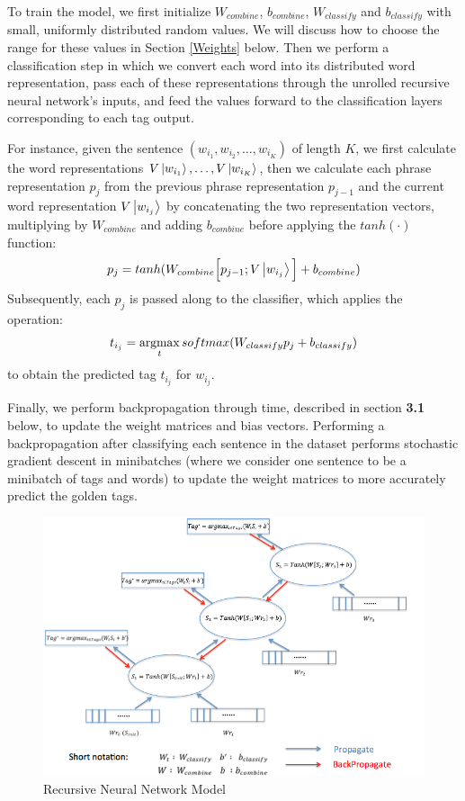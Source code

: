 \documentclass[11pt]{article}
\newcommand{\argmax}{\operatornamewithlimits{argmax}}
\begin{document}
To train the model, we first initialize $W_{combine}$, $b_{combine}$, $W_{classify}$ and $b_{classify}$ with small, uniformly distributed random values. We will discuss how to choose the range for these values in Section \ref{Weights} below. Then we perform a classification step in which we convert each word into its distributed word representation, pass each of these representations through the unrolled recursive neural network's inputs, and feed the values forward to the classification layers corresponding to each tag output.

For instance, given the sentence $(w_{i_1},w_{i_2},\ldots,w_{i_K})$ of length $K$, we first calculate the word representations $V\Ket{w_{i_1}},\ldots,V\Ket{w_{i_K}}$, then we calculate each phrase representation $p_j$ from the previous phrase representation $p_{j-1}$ and the current word representation $V\Ket{w_{i_j}}$ by concatenating the two representation vectors, multiplying by $W_{combine}$ and adding $b_{combine}$ before applying the $tanh(\cdot)$ function:
$$p_j = tanh(W_{combine}\Big[p_{j-1};V\Ket{w_{i_j}}\Big] + b_{combine})$$
Subsequently, each $p_j$ is passed along to the classifier, which applies the operation:
$$t_{i_j} = \argmax\limits_{t} softmax(W_{classify}p_j + b_{classify})$$
to obtain the predicted tag $t_{i_j}$ for $w_{i_j}$.

Finally, we perform backpropagation through time, described in section \textbf{3.1} below, to update the weight matrices and bias vectors. Performing a backpropagation after classifying each sentence in the dataset performs stochastic gradient descent in minibatches (where we consider one sentence to be a minibatch of tags and words) to update the weight matrices to more accurately predict the golden tags.

\begin{figure}
	\includegraphics[scale=0.3]{model_figure.png}
	\caption{Recursive Neural Network Model}\label{Model_fig}
\end{figure}
\end{document}
